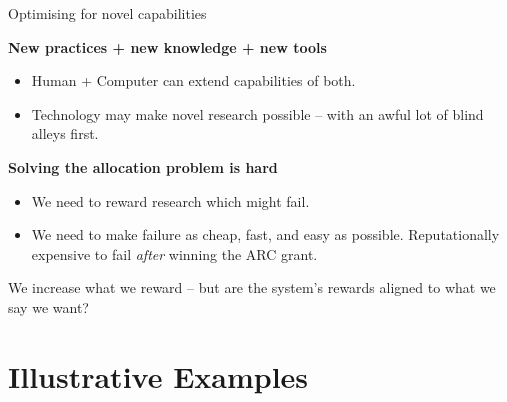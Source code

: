 \documentclass[aspectratio=169, 11pt]{beamer} %
\begin{document}

\begin{frame}{Optimising for novel capabilities}

\textbf{New practices + new knowledge + new tools }
\begin{itemize}
    \item Human + Computer can extend capabilities of both. \parencite{Vinge1993-vq}
    \item Technology may make novel research possible -- with an awful lot of blind alleys first.
\end{itemize}

\textbf{Solving the allocation problem is hard}
\begin{itemize}
    \item We need to reward research which might fail.
    \item We need to make failure as cheap, fast, and easy as possible. Reputationally expensive to fail \textit{after} winning the ARC grant.
\end{itemize}

We increase what we reward -- but are the system's rewards aligned to what we say we want? \parencite{Beer2002-tl}
\end{frame}

\section{Illustrative Examples}%
\end{document}
